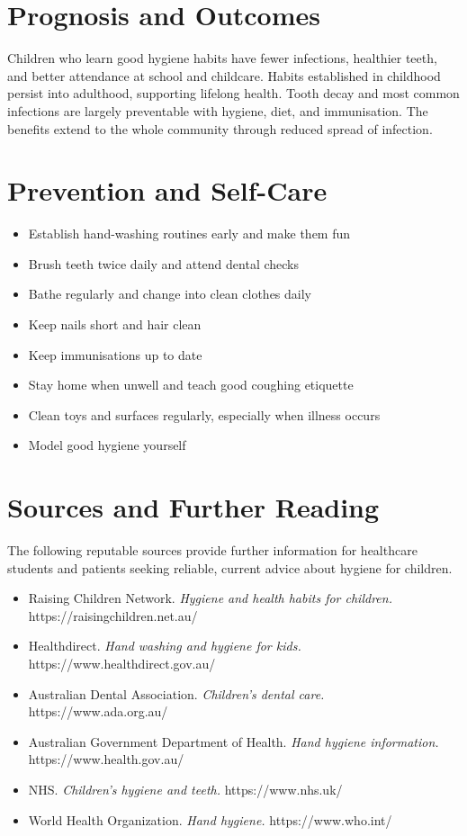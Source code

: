 \section*{Prognosis and Outcomes}
Children who learn good hygiene habits have fewer infections, healthier teeth, and better attendance at school and childcare. Habits established in childhood persist into adulthood, supporting lifelong health. Tooth decay and most common infections are largely preventable with hygiene, diet, and immunisation. The benefits extend to the whole community through reduced spread of infection.

\section*{Prevention and Self-Care}
\begin{itemize}
    \item Establish hand-washing routines early and make them fun
    \item Brush teeth twice daily and attend dental checks
    \item Bathe regularly and change into clean clothes daily
    \item Keep nails short and hair clean
    \item Keep immunisations up to date
    \item Stay home when unwell and teach good coughing etiquette
    \item Clean toys and surfaces regularly, especially when illness occurs
    \item Model good hygiene yourself
\end{itemize}

\section*{Sources and Further Reading}
The following reputable sources provide further information for healthcare students and patients seeking reliable, current advice about hygiene for children.

\begin{itemize}
    \item Raising Children Network. \textit{Hygiene and health habits for children.} https://raisingchildren.net.au/
    \item Healthdirect. \textit{Hand washing and hygiene for kids.} https://www.healthdirect.gov.au/
    \item Australian Dental Association. \textit{Children's dental care.} https://www.ada.org.au/
    \item Australian Government Department of Health. \textit{Hand hygiene information.} https://www.health.gov.au/
    \item NHS. \textit{Children's hygiene and teeth.} https://www.nhs.uk/
    \item World Health Organization. \textit{Hand hygiene.} https://www.who.int/
\end{itemize}
